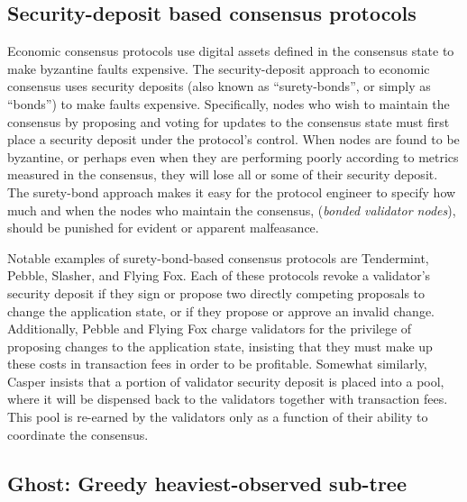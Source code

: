 \documentclass[11pt,a4paper]{article}
\begin{document}
\subsection{Security-deposit based consensus protocols}

Economic consensus protocols use digital assets defined in the consensus state to make byzantine faults expensive. The security-deposit approach to economic consensus uses security deposits (also known as ``surety-bonds'', or simply as ``bonds'') to make faults expensive. Specifically, nodes who wish to maintain the consensus by proposing and voting for updates to the consensus state must first place a security deposit under the protocol's control. When nodes are found to be byzantine, or perhaps even when they are performing poorly according to metrics measured in the consensus, they will lose all or some of their security deposit. The surety-bond approach makes it easy for the protocol engineer to specify how much and when the nodes who maintain the consensus, (\emph{bonded validator nodes}), should be punished for evident or apparent malfeasance.

Notable examples of surety-bond-based consensus protocols are Tendermint\cite{TM}, Pebble\cite{Pebble}, Slasher\cite{Slasher}, and Flying Fox\cite{FlyingFox}. Each of these protocols revoke a validator's security deposit if they sign or propose two directly competing proposals to change the application state, or if they propose or approve an invalid change. Additionally, Pebble and Flying Fox charge validators for the privilege of proposing changes to the application state, insisting that they must make up these costs in transaction fees in order to be profitable. Somewhat similarly, Casper insists that a portion of validator security deposit is placed into a pool, where it will be dispensed back to the validators together with transaction fees. This pool is re-earned by the validators only as a function of their ability to coordinate the consensus. 


\subsection{Ghost: Greedy heaviest-observed sub-tree}
\end{document}

